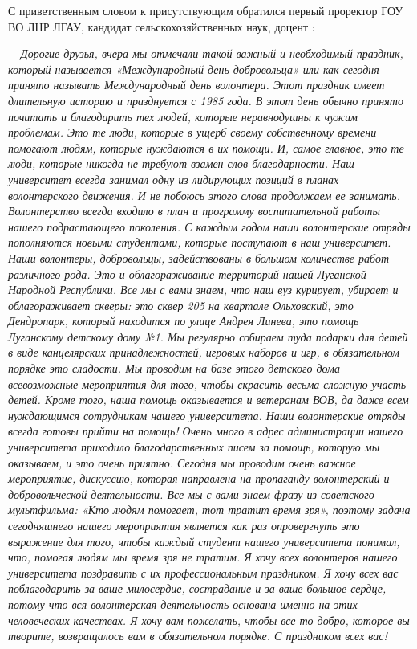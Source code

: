С приветственным словом к присутствующим обратился первый проректор ГОУ ВО ЛНР
ЛГАУ, кандидат сельскохозяйственных наук, доцент :

\begin{displayquote}
\em\color{magenta}
− Дорогие друзья, вчера мы отмечали такой важный и необходимый праздник,
который называется «Международный день добровольца» или как сегодня принято
называть Международный день волонтера. Этот праздник имеет длительную
историю и празднуется с 1985 года. В этот день обычно принято почитать и
благодарить тех людей, которые неравнодушны к чужим проблемам. Это те люди,
которые в ущерб своему собственному времени помогают людям, которые
нуждаются в их помощи. И, самое главное, это те люди, которые никогда не
требуют взамен слов благодарности.  Наш университет всегда занимал одну из
лидирующих позиций в планах волонтерского движения. И не побоюсь этого
слова продолжаем ее занимать. Волонтерство всегда входило в план и
программу воспитательной работы нашего подрастающего поколения. С каждым
годом наши волонтерские отряды пополняются новыми студентами, которые
поступают в наш университет. Наши волонтеры, добровольцы, задействованы в
большом количестве работ различного рода. Это и облагораживание территорий
нашей Луганской Народной Республики. Все мы с вами знаем, что наш вуз
курирует, убирает и облагораживает скверы: это сквер 205 на квартале
Ольховский, это Дендропарк, который находится по улице Андрея Линева, это
помощь Луганскому детскому дому №1. Мы регулярно собираем туда подарки для
детей в виде канцелярских принадлежностей, игровых наборов и игр, в
обязательном порядке это сладости. Мы проводим на базе этого детского дома
всевозможные мероприятия для того, чтобы скрасить весьма сложную участь
детей. Кроме того, наша помощь оказывается и ветеранам ВОВ, да даже всем
нуждающимся сотрудникам нашего университета. Наши волонтерские отряды
всегда готовы прийти на помощь! Очень много в адрес администрации нашего
университета приходило благодарственных писем за помощь, которую мы
оказываем, и это очень приятно. Сегодня мы проводим очень важное
мероприятие, дискуссию, которая направлена на пропаганду волонтерский и
добровольческой деятельности. Все мы с вами знаем фразу из советского
мультфильма: «Кто людям помогает, тот тратит время зря», поэтому задача
сегодняшнего нашего мероприятия является как раз опровергнуть это выражение
для того, чтобы каждый студент нашего университета понимал, что, помогая
людям мы время зря не тратим. Я хочу всех волонтеров нашего университета
поздравить с их профессиональным праздником. Я хочу всех вас поблагодарить
за ваше милосердие, сострадание и за ваше большое сердце, потому что вся
волонтерская деятельность основана именно на этих человеческих качествах. Я
хочу вам пожелать, чтобы все то добро, которое вы творите, возвращалось вам
в обязательном порядке. С праздником всех вас!
\end{displayquote}

